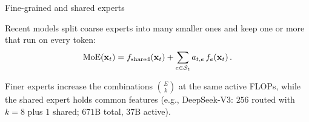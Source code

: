 \documentclass[11pt,aspectratio=169]{beamer}
\begin{document}
\begin{frame}{Fine-grained and shared experts}
    \setlength{\parskip}{4pt}
    \setlength{\abovedisplayskip}{3pt}\setlength{\belowdisplayskip}{4pt}

    Recent models split coarse experts into many smaller ones and keep one or
    more  that run on every token:
    \[
        \operatorname{MoE}(\boldsymbol{\mathbf{x}}_t)
        = f_{\text{shared}}(\boldsymbol{\mathbf{x}}_t)
        + \sum_{e\in\mathcal{S}_t} a_{t,e}\,f_e(\boldsymbol{\mathbf{x}}_t) \,.
    \]

    \centering
    
    \par\vspace{-0.4em}
    \justifying

    Finer experts increase the combinations $\binom{E}{k}$ at the same active
    FLOPs, while the shared expert holds common features (e.g., DeepSeek-V3:
    $256$ routed with $k=8$ plus $1$ shared; $671$B total, $37$B active).


\end{frame}
\end{document}
